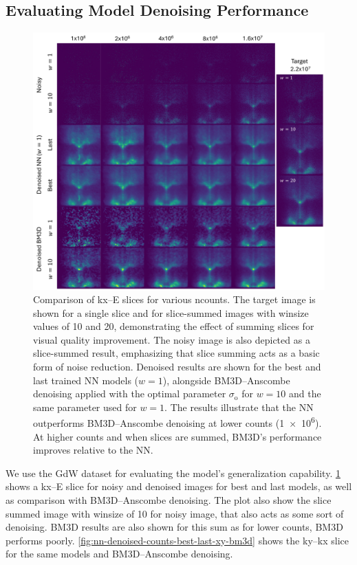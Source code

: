 \subsection{Evaluating Model Denoising Performance}
\begin{figure}
    \centering
    \includegraphics[width=1\linewidth]{images/nn_denoised_counts_best_last_ex_bm3d.pdf}
    \caption{Comparison of \gls{kx}–\gls{E} slices for various \gls{ncounts}. The target image is shown for a single slice and for slice-summed images with \gls{winsize} values of \num{10} and \num{20}, demonstrating the effect of summing slices for visual quality improvement. The noisy image is also depicted as a slice-summed result, emphasizing that slice summing acts as a basic form of noise reduction. Denoised results are shown for the best and last trained \gls{NN} models ($w=1$), alongside \gls{BM3D}–Anscombe denoising applied with the optimal parameter $\sigma_{\text{o}}$ for $w=10$ and the same parameter used for $w=1$. The results illustrate that the \gls{NN} outperforms BM3D–Anscombe denoising at lower counts (\num{1e6}). At higher counts and when slices are summed, BM3D’s performance improves relative to the \gls{NN}.}
    \label{fig:nn-denoised-counts-best-last-ex-bm3d}
\end{figure}

We use the \gls{GdW} dataset for evaluating the model's generalization capability. \cref{fig:nn-denoised-counts-best-last-ex-bm3d} shows a \gls{kx}--\gls{E} slice for noisy and denoised images for best and last models, as well as comparison with \gls{BM3D}--Anscombe denoising. The plot also show the slice summed image with \gls{winsize} of \num{10} for noisy image, that also acts as some sort of denoising. BM3D results are also shown for this sum as for lower counts, BM3D performs poorly. \cref{fig:nn-denoised-counts-best-last-xy-bm3d} shows the \gls{ky}--\gls{kx} slice for the same models and \gls{BM3D}--Anscombe denoising.

